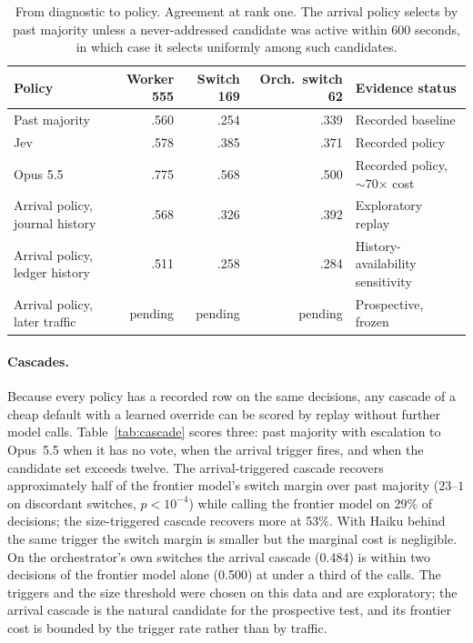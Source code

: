 \documentclass[11pt]{article}
\theoremstyle{definition}
\begin{document}
\begin{table}[t]
\centering\footnotesize
\caption{From diagnostic to policy. Agreement at rank one. The arrival policy selects by past majority unless a never-addressed candidate was active within 600 seconds, in which case it selects uniformly among such candidates.}
\label{tab:policy}
\begin{tabular}{lrrrl}
\toprule
Policy & Worker 555 & Switch 169 & Orch.\ switch 62 & Evidence status \\
\midrule
Past majority & .560 & .254 & .339 & Recorded baseline \\
Jev & .578 & .385 & .371 & Recorded policy \\
Opus 5.5 & .775 & .568 & .500 & Recorded policy, $\sim$70$\times$ cost \\
Arrival policy, journal history & .568 & .326 & .392 & Exploratory replay \\
Arrival policy, ledger history & .511 & .258 & .284 & History-availability sensitivity \\
Arrival policy, later traffic & pending & pending & pending & Prospective, frozen \\
\bottomrule
\end{tabular}
\end{table}

\paragraph{Cascades.}
Because every policy has a recorded row on the same decisions, any cascade of a cheap default with a learned override can be scored by replay without further model calls. Table~\ref{tab:cascade} scores three: past majority with escalation to Opus~5.5 when it has no vote, when the arrival trigger fires, and when the candidate set exceeds twelve. The arrival-triggered cascade recovers approximately half of the frontier model's switch margin over past majority ($23$--$1$ on discordant switches, $p<10^{-4}$) while calling the frontier model on 29\% of decisions; the size-triggered cascade recovers more at 53\%. With Haiku behind the same trigger the switch margin is smaller but the marginal cost is negligible. On the orchestrator's own switches the arrival cascade (0.484) is within two decisions of the frontier model alone (0.500) at under a third of the calls. The triggers and the size threshold were chosen on this data and are exploratory; the arrival cascade is the natural candidate for the prospective test, and its frontier cost is bounded by the trigger rate rather than by traffic.
\end{document}
